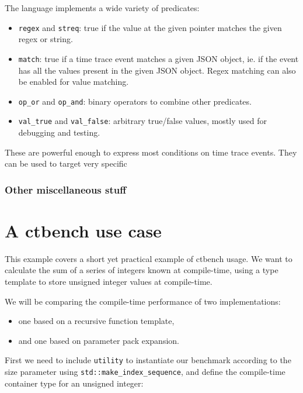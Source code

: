 \documentclass[../../main.tex]{subfiles}
\begin{document}
The language implements a wide variety of predicates:

\begin{itemize}
\item \lstinline{regex} and \lstinline{streq}: true if the value at the given
      pointer matches the given regex or string.
\item \lstinline{match}: true if a time trace event matches a given JSON object,
      ie. if the event has all the values present in the given JSON object.
      Regex matching can also be enabled for value matching.
\item \lstinline{op_or} and \lstinline{op_and}: binary operators to combine
      other predicates.
\item \lstinline{val_true} and \lstinline{val_false}: arbitrary true/false
      values, mostly used for debugging and testing.
\end{itemize}

These are powerful enough to express most conditions on time trace events.
They can be used to target very specific

\subsubsection{Other miscellaneous stuff}


\section{A ctbench use case}

This example covers a short yet practical example of ctbench usage. We want to
calculate the sum of a series of integers known at compile-time, using a type
template to store unsigned integer values at compile-time.

We will be comparing the compile-time performance of two implementations:

\begin{itemize}
\item one based on a recursive function template,
\item and one based on  parameter pack expansion.
\end{itemize}

First we need to include \lstinline{utility} to instantiate our benchmark according to the
size parameter using \lstinline{std::make_index_sequence}, and define the compile-time
container type for an unsigned integer:
\end{document}
